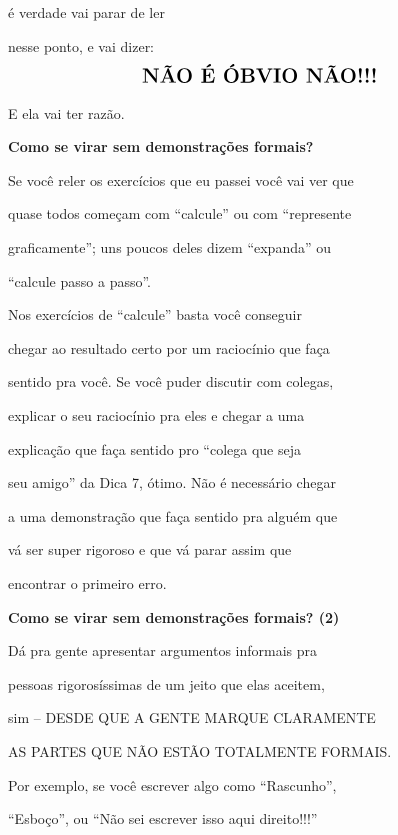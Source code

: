 \documentclass[oneside,12pt]{article}
\begin{document}
é verdade  vai parar de ler

nesse ponto, e vai dizer:
%
$$\text{\Large \bf NÃO É ÓBVIO NÃO!!!}$$

E ela vai ter razão.


\newpage


{\bf Como se virar sem demonstrações formais?}

Se você reler os exercícios que eu passei você vai ver que

quase todos começam com ``calcule'' ou com ``represente

graficamente''; uns poucos deles dizem ``expanda'' ou

``calcule passo a passo''.

\msk

Nos exercícios de ``calcule'' basta você conseguir

chegar ao resultado certo por um raciocínio que faça

sentido pra você. Se você puder discutir com colegas,

explicar o seu raciocínio pra eles e chegar a uma

explicação que faça sentido pro ``colega que seja

seu amigo'' da Dica 7, ótimo. Não é necessário chegar

a uma demonstração que faça sentido pra alguém que

vá ser super rigoroso e que vá parar assim que

encontrar o primeiro erro.

\newpage


{\bf Como se virar sem demonstrações formais? (2)}

Dá pra gente apresentar argumentos informais pra

pessoas rigorosíssimas de um jeito que elas aceitem,

sim -- DESDE QUE A GENTE MARQUE CLARAMENTE

AS PARTES QUE NÃO ESTÃO TOTALMENTE FORMAIS.

\msk

Por exemplo, se você escrever algo como ``Rascunho'',

``Esboço'', ou ``Não sei escrever isso aqui direito!!!''
\end{document}
